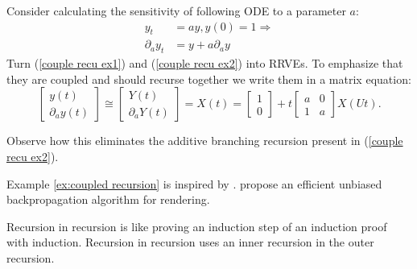 \documentclass[a4paper,12pt]{article}
\begin{document}
\begin{example} \label{ex:coupled recursion}
    Consider calculating the
    sensitivity of following ODE to a
    parameter $a$:
    \begin{align}
        y_t             & =ay,y(0)=1 \Rightarrow \label{couple recu ex1} \\
        \partial_{a}y_t & = y + a \partial_{a}y \label{couple recu ex2}
    \end{align}
    Turn (\ref{couple recu ex1}) and (\ref{couple recu ex2}) into RRVEs.
    To emphasize that they are coupled and should
    recurse together we write them in a matrix equation:
    \begin{equation} \label{coupled mat}
        \begin{bmatrix}
            y(t) \\
            \partial_{a}y(t)
        \end{bmatrix} \cong
        \begin{bmatrix}
            Y(t) \\
            \partial_{a}Y(t)
        \end{bmatrix}=
        X(t)=
        \begin{bmatrix}
            1 \\
            0
        \end{bmatrix}+
        t \begin{bmatrix}
            a & 0 \\
            1 & a
        \end{bmatrix}
        X(Ut).
    \end{equation}

    Observe how this eliminates the additive branching recursion
    present in (\ref{couple recu ex2}).

\end{example}

\begin{pythonn} 
\end{pythonn}

\begin{related}
    Example \ref{ex:coupled recursion} is inspired by \cite{vicini_path_2021}.
    \cite{vicini_path_2021} propose an efficient unbiased backpropagation
    algorithm for rendering.
\end{related}

\begin{technique}\label{tech:recu in recu}
    Recursion in recursion is like proving an induction
    step of an induction proof with induction. Recursion in recursion
    uses an inner recursion in the outer recursion.
\end{technique}
\end{document}
